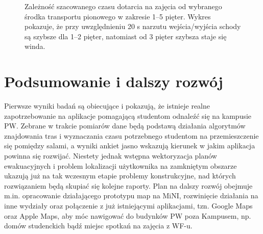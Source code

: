 \documentclass[14pt,a4paper]{extarticle}
\begin{document}
\begin{figure}[H]
    \centering
    \caption{Zależność szacowanego czasu dotarcia na zajęcia od wybranego środka transportu pionowego w zakresie 1--5 pięter. Wykres pokazuje, że przy uwzględnieniu 20 s narzutu wejścia/wyjścia schody są szybsze dla 1--2 pięter, natomiast od 3 pięter szybsza staje się winda.}
    \label{fig:wykres-windy}
\end{figure}

\section{Podsumowanie i dalszy rozwój}

Pierwsze wyniki badań są obiecujące i pokazują, że istnieje realne zapotrzebowanie na aplikacje pomagającą studentom odnaleźć się na kampusie PW. Zebrane w trakcie pomiarów dane będą podstawą działania algorytmów znajdowania tras i wyznaczania czasu potrzebnego studentom na przemieszczenie się pomiędzy salami, a wyniki ankiet jasno wskazują kierunek w jakim aplikacja powinna się rozwijać. Niestety jednak wstępna wektoryzacja planów ewakuacyjnych i problem lokalizacji użytkownika na zamkniętym obszarze ukazują już na tak wczesnym etapie problemy konstrukcyjne, nad których rozwiązaniem będą skupiać się kolejne raporty. Plan na dalszy rozwój obejmuje m.in. opracowanie działającego prototypu map na MiNI, rozwinięcie działania na inne wydziały oraz połączenie z już istniejącymi aplikacjami, tzn. Google Maps oraz Apple Maps, aby móc nawigować do budynków PW poza Kampusem, np. domów studenckich bądź miejsc spotkań na zajęcia z WF-u.
\end{document}
